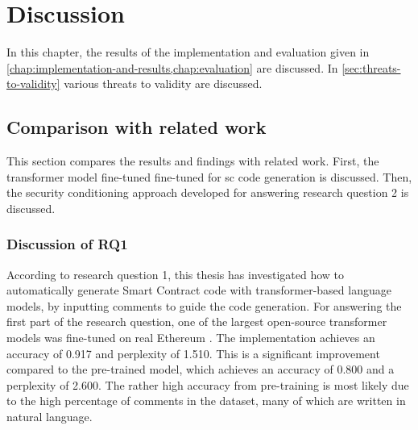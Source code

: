 \chapter{Discussion}
\label{chap:discussion}
In this chapter, the results of the implementation and evaluation given in \cref{chap:implementation-and-results,chap:evaluation} are discussed. In \cref{sec:threats-to-validity} various threats to validity are discussed.

\section{Comparison with related work}
This section compares the results and findings with related work. First, the transformer model fine-tuned fine-tuned for \acrshort{sc} code generation is discussed. Then, the security conditioning approach developed for answering research question 2 is discussed. 


\subsection{Discussion of RQ1}
According to research question 1, this thesis has investigated how to automatically generate Smart Contract code with transformer-based language models, by inputting comments to guide the code generation. For answering the first part of the research question, one of the largest open-source transformer models was fine-tuned on real Ethereum . The implementation achieves an accuracy of 0.917 and perplexity of 1.510. This is a significant improvement compared to the pre-trained model, which achieves an accuracy of 0.800 and a perplexity of 2.600. The rather high accuracy from pre-training is most likely due to the high percentage of comments in the dataset, many of which are written in natural language. 

